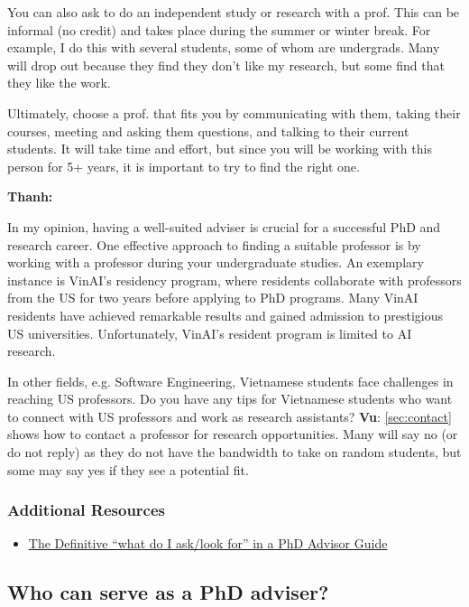 \documentclass[oneside,11pt,dvipsnames]{book}
\newenvironment{commentbox}[1][]{
  \small
  \begin{mybox}
    {\small \textbf{#1}}
  }{
  \end{mybox}
}
\begin{document}
You can also ask to do an independent study or research with a prof. This can be informal (no credit) and takes place during the summer or winter break.  For example, I do this with several students, some of whom are undergrads. Many will drop out because they find they don't like my research, but some find that they like the work.

Ultimately, choose a prof. that fits you by communicating with them, taking their courses, meeting and asking them questions, and talking to their current students. It will take time and effort, but since you will be working with this person for 5+ years, it is important to try to find the right one.

\begin{commentbox}[Thanh:]
  In my opinion, having a well-suited adviser is crucial for a successful PhD and research career. One effective approach to finding a suitable professor is by working with a professor during your undergraduate studies. An exemplary instance is VinAI's residency program, where residents collaborate with professors from the US for two years before applying to PhD programs. Many VinAI residents have achieved remarkable results and gained admission to prestigious US universities. Unfortunately, VinAI's resident program is limited to AI research.

  In other fields, e.g. Software Engineering, Vietnamese students face challenges in reaching US professors. Do you have any tips for Vietnamese students who want to connect with US professors and work as research assistants?
  \tcblower
  \textbf{Vu}: \autoref{sec:contact} shows how to contact a professor for research opportunities. Many will say no (or do not reply) as they do not have the bandwidth to take on random students, but some may say yes if they see a potential fit.
\end{commentbox}

\subsubsection*{Additional Resources}
\begin{itemize}
  \item \href{https://www.cs.columbia.edu/wp-content/uploads/2019/03/Get-Advisor.pdf}{The Definitive ``what do I ask/look for'' in a PhD Advisor Guide}
\end{itemize}
\subsection{Who can serve as a PhD adviser?}\label{sec:faculty-types}
\end{document}
